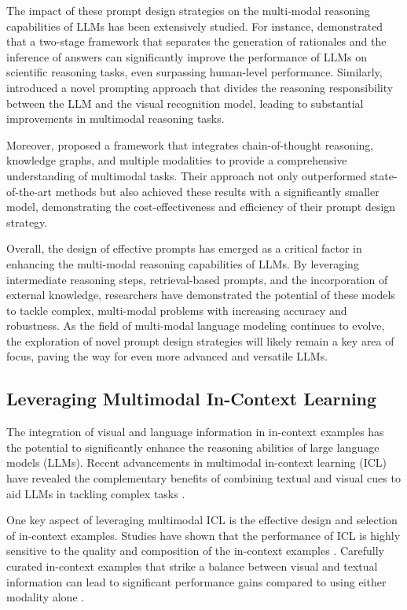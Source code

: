 \documentclass[11pt]{article}
\begin{document}
The impact of these prompt design strategies on the multi-modal reasoning capabilities of LLMs has been extensively studied. For instance, \cite{ref94} demonstrated that a two-stage framework that separates the generation of rationales and the inference of answers can significantly improve the performance of LLMs on scientific reasoning tasks, even surpassing human-level performance. Similarly, \cite{ref145} introduced a novel prompting approach that divides the reasoning responsibility between the LLM and the visual recognition model, leading to substantial improvements in multimodal reasoning tasks.

Moreover, \cite{ref96} proposed a framework that integrates chain-of-thought reasoning, knowledge graphs, and multiple modalities to provide a comprehensive understanding of multimodal tasks. Their approach not only outperformed state-of-the-art methods but also achieved these results with a significantly smaller model, demonstrating the cost-effectiveness and efficiency of their prompt design strategy.

Overall, the design of effective prompts has emerged as a critical factor in enhancing the multi-modal reasoning capabilities of LLMs. By leveraging intermediate reasoning steps, retrieval-based prompts, and the incorporation of external knowledge, researchers have demonstrated the potential of these models to tackle complex, multi-modal problems with increasing accuracy and robustness. As the field of multi-modal language modeling continues to evolve, the exploration of novel prompt design strategies will likely remain a key area of focus, paving the way for even more advanced and versatile LLMs.

\subsection{Leveraging Multimodal In-Context Learning}

The integration of visual and language information in in-context examples has the potential to significantly enhance the reasoning abilities of large language models (LLMs). Recent advancements in multimodal in-context learning (ICL) have revealed the complementary benefits of combining textual and visual cues to aid LLMs in tackling complex tasks \cite{ref293,ref294,ref295}.

One key aspect of leveraging multimodal ICL is the effective design and selection of in-context examples. Studies have shown that the performance of ICL is highly sensitive to the quality and composition of the in-context examples \cite{ref296,ref297}. Carefully curated in-context examples that strike a balance between visual and textual information can lead to significant performance gains compared to using either modality alone \cite{ref95}.
\end{document}
